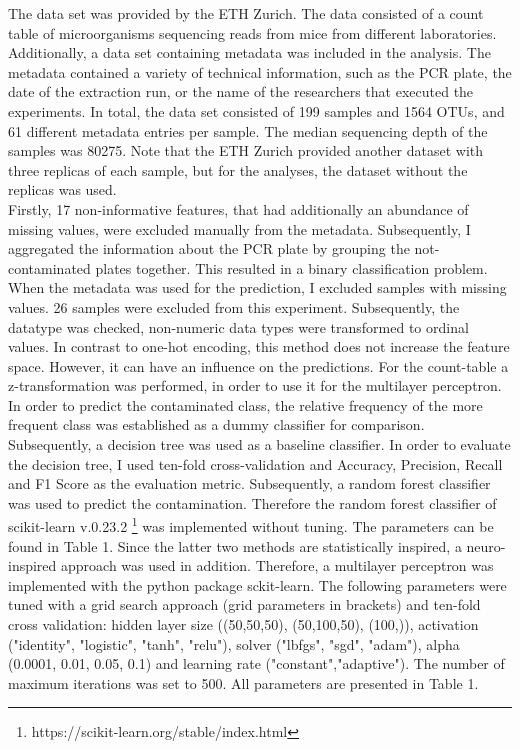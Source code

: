 \documentclass{svproc}
\begin{document}
The data set was provided by the ETH Zurich. The data consisted of a count table of microorganisms sequencing reads from mice from different laboratories. Additionally, a data set containing metadata was included in the analysis. The metadata contained a variety of technical information, such as the PCR plate, the date of the extraction run, or the name of the researchers that executed the experiments. In total, the data set consisted of 199 samples and 1564 OTUs, and 61 different metadata entries per sample. The median sequencing depth of the samples was 80275. Note that the ETH Zurich provided another dataset with three replicas of each sample, but for the analyses, the dataset without the replicas was used.\\
Firstly, 17 non-informative features, that had additionally an abundance of missing values, were excluded manually from the metadata. Subsequently, I aggregated the information about the PCR plate by grouping the not-contaminated plates together. This resulted in a binary classification problem.  When the metadata was used for the prediction, I excluded samples with missing values. 26 samples were excluded from this experiment. Subsequently, the datatype was checked, non-numeric data types were transformed to ordinal values. In contrast to one-hot encoding, this method does not increase the feature space. However, it can have an influence on the predictions.
For the count-table a z-transformation was performed, in order to use it for the multilayer perceptron.\\

In order to predict the contaminated class, the relative frequency of the more frequent class was established as a dummy classifier for comparison. Subsequently, a decision tree was used as a baseline classifier. In order to evaluate the decision tree, I used ten-fold cross-validation and Accuracy, Precision, Recall and F1 Score as the evaluation metric.
Subsequently, a random forest classifier was used to predict the contamination. Therefore the random forest classifier of scikit-learn v.0.23.2 \footnote{https://scikit-learn.org/stable/index.html} was implemented without tuning. The parameters can be found in Table 1. Since the latter two methods are statistically inspired, a neuro-inspired approach was used in addition. Therefore, a multilayer perceptron was implemented with the python package sckit-learn. The following parameters  were tuned with a grid search approach (grid parameters in brackets) and ten-fold cross validation: hidden layer size ((50,50,50), (50,100,50), (100,)), activation ("identity", "logistic", "tanh", "relu"), solver ("lbfgs", "sgd", "adam"), alpha (0.0001, 0.01, 0.05, 0.1) and learning rate ("constant","adaptive"). The number of maximum iterations was set to 500. All parameters are presented in Table 1.
\end{document}
